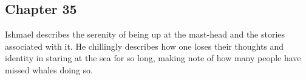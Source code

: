 \subsection{Chapter 35}

Ishmael describes the serenity of being up at the mast-head and the stories
associated with it. He chillingly describes how one loses their thoughts and
identity in staring at the sea for so long, making note of how many people have
missed whales doing so.

